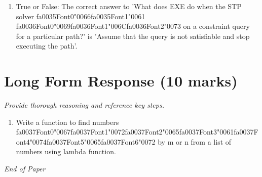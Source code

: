 \documentclass[12pt]{article}
\begin{document}
\begin{enumerate}[label=\arabic*.]
\item True or False: The correct answer to 'What does EXE do when the STP solver {\csname fa0035Font0\endcsname\char"0066}{\csname fa0035Font1\endcsname\char"0061} {\csname fa0036Font0\endcsname\char"0069}{\csname fa0036Font1\endcsname\char"006C}{\csname fa0036Font2\endcsname\char"0073} on a constraint query for a particular path?' is 'Assume that the query is not satisfiable and stop executing the path'.
\end{enumerate}

\section*{Long Form Response (10 marks)}
\textit{Provide thorough reasoning and reference key steps.}
\begin{enumerate}[label=\arabic*.]
\item Write a function to find numbers {\csname fa0037Font0\endcsname\char"0067}{\csname fa0037Font1\endcsname\char"0072}{\csname fa0037Font2\endcsname\char"0065}{\csname fa0037Font3\endcsname\char"0061}{\csname fa0037Font4\endcsname\char"0074}{\csname fa0037Font5\endcsname\char"0065}{\csname fa0037Font6\endcsname\char"0072} by m or n from a list of numbers using lambda
function.
\end{enumerate}

\vfill
\noindent\textit{End of Paper}
\end{document}
